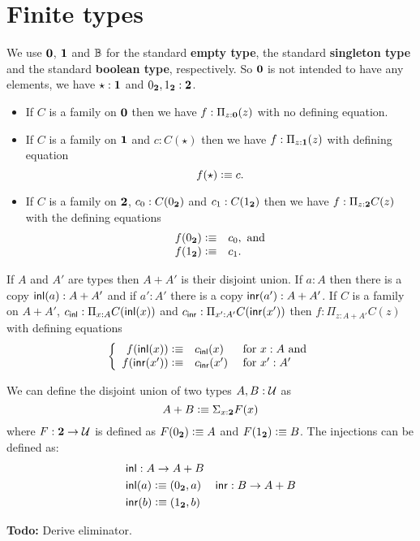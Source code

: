 {\section{Finite types}
\label{sec:finite-types}

We use $\mathbf{0}$, $\mathbf{1}$ and $\mathbb{B}$ for the standard {\bf empty
  type}, the standard {\bf singleton type} and the standard {\bf
  boolean type}, respectively.  So $\mathbf{0}$ is not intended to have
any elements, we have $\star:\mathbf{1}$ and $0_\mathbf{2},1_\mathbf{2}:\mathbf{2}$.
\begin{itemize}
\item If $C$ is a family on $\mathbf{0}$ then we have $f:\Pi_{z:\mathbf{0}}(z)$ with no defining equation.
\item If $C$ is a family on $\mathbf{1}$ and $c:C(\star)$ then we have $f:\Pi_{z:\mathbf{1}}(z)$ with defining equation
  \[ f(\star)\vcentcolon\equiv c.\]
\item If $C$ is a family on $\mathbf{2}$, $c_0:C(0_\mathbf{2})$ 
and $c_1:C(1_\mathbf{2})$ then we have $f:\Pi_{z:\mathbf{2}}C(z)$ with the defining equations
 \[ \begin{array}{rl}
f(0_\mathbf{2}) \vcentcolon\equiv& c_0, \mbox{ and}\\
f(1_\mathbf{2}) \vcentcolon\equiv& c_1.
  \end{array}\]
\end{itemize}

If $A$ and $A'$ are types then $A+A'$ is their disjoint union.  If
$a:A$ then there is a copy $\mathsf{inl}(a):A+A'$ and if $a':A'$ there is a
copy $\mathsf{inr}(a'):A+A'$.
If $C$ is a family on $A+A'$, $c_\mathsf{inl}:\Pi_{x:A}C(\mathsf{inl}(x))$ and $c_\mathsf{inr}:\Pi_{x':A'}C(\mathsf{inr}(x'))$ then $f:\Pi_{z:A+A'}C(z)$ with defining equations
  \[\left\{\begin{array}{rll} 
f(\mathsf{inl}(x))\vcentcolon\equiv& c_\mathsf{inl}(x)&\mbox{ for } x:A \mbox{ and}\\
f(\mathsf{inr}(x'))\vcentcolon\equiv& c_\mathsf{inr}(x')&\mbox{ for } x':A'\\
\end{array}\right.\]

We can define the disjoint union of two types $A,B:\mathcal{U}$ as
\[A + B \vcentcolon\equiv \Sigma_{x:\mathbf{2}}F(x)\]
where $F : \mathbf{2} \to \mathcal{U}$ is
defined as $F(0_\mathbf{2}) \vcentcolon\equiv A$ and $F(1_\mathbf{2})\vcentcolon\equiv B$. The
injections can be defined as:
\begin{align*}
& \mathsf{inl} :  A \to A+B\\
& \mathsf{inl}(a) \vcentcolon\equiv (0_\mathbf{2},a)
& \mathsf{inr} :  B \to A+B\\
& \mathsf{inr}(b) \vcentcolon\equiv (1_\mathbf{2},b)
\end{align*}

\textbf{Todo:} Derive eliminator.

}

